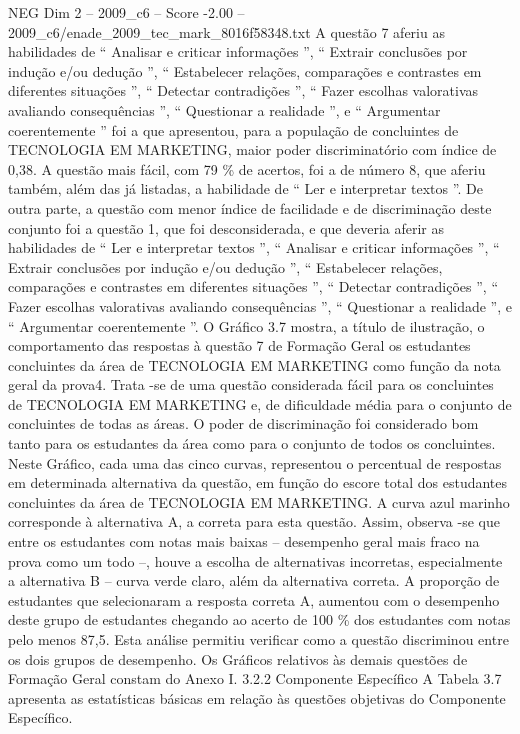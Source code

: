 \begin{textsample}{NEG Dim 2 – 2009\_c6 – Score -2.00 – 2009\_c6/enade\_2009\_tec\_mark\_8016f58348.txt}
A questão 7 aferiu as habilidades de “ Analisar e criticar informações ”, “ Extrair conclusões por indução e/ou dedução ”, “ Estabelecer relações, comparações e contrastes em diferentes situações ”, “ Detectar contradições ”, “ Fazer escolhas valorativas avaliando consequências ”, “ Questionar a realidade ”, e “ Argumentar coerentemente ” foi a que apresentou, para a população de concluintes de TECNOLOGIA EM MARKETING, maior poder discriminatório com índice de 0,38.
A questão mais fácil, com 79 \% de acertos, foi a de número 8, que aferiu também, além das já listadas, a habilidade de “ Ler e interpretar textos ”.
De outra parte, a questão com menor índice de facilidade e de discriminação deste conjunto foi a questão 1, que foi desconsiderada, e que deveria aferir as habilidades de “ Ler e interpretar textos ”, “ Analisar e criticar informações ”, “ Extrair conclusões por indução e/ou dedução ”, “ Estabelecer relações, comparações e contrastes em diferentes situações ”, “ Detectar contradições ”, “ Fazer escolhas valorativas avaliando consequências ”, “ Questionar a realidade ”, e “ Argumentar coerentemente ”.
O Gráfico 3.7 mostra, a título de ilustração, o comportamento das respostas à questão 7 de Formação Geral os estudantes concluintes da área de TECNOLOGIA EM MARKETING como função da nota geral da prova4.
Trata -se de uma questão considerada fácil para os concluintes de TECNOLOGIA EM MARKETING e, de dificuldade média para o conjunto de concluintes de todas as áreas.
O poder de discriminação foi considerado bom tanto para os estudantes da área como para o conjunto de todos os concluintes.
Neste Gráfico, cada uma das cinco curvas, representou o percentual de respostas em determinada alternativa da questão, em função do escore total dos estudantes concluintes da área de TECNOLOGIA EM MARKETING.
A curva azul marinho corresponde à alternativa A, a correta para esta questão.
Assim, observa -se que entre os estudantes com notas mais baixas – desempenho geral mais fraco na prova como um todo –, houve a escolha de alternativas incorretas, especialmente a alternativa B – curva verde claro, além da alternativa correta.
A proporção de estudantes que selecionaram a resposta correta A, aumentou com o desempenho deste grupo de estudantes chegando ao acerto de 100 \% dos estudantes com notas pelo menos 87,5.
Esta análise permitiu verificar como a questão discriminou entre os dois grupos de desempenho.
Os Gráficos relativos às demais questões de Formação Geral constam do Anexo I. 3.2.2 Componente Específico A Tabela 3.7 apresenta as estatísticas básicas em relação às questões objetivas do Componente Específico.

\end{textsample}
